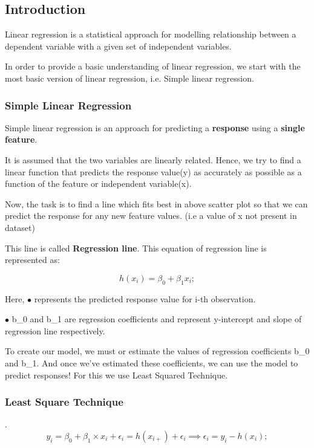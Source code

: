 \subsection{Introduction}

Linear regression is a statistical approach for modelling relationship between a dependent variable with a given set of independent variables.

In order to provide a basic understanding of linear regression, we start with the most basic version of linear regression, i.e. Simple linear regression.

\subsubsection{Simple Linear Regression}
Simple linear regression is an approach for predicting a \textbf{response} using a \textbf{single feature}.

It is assumed that the two variables are linearly related. Hence, we try to find a linear function that predicts the response value(y) as accurately as possible as a function of the feature or independent variable(x).

Now, the task is to find a line which fits best in above scatter plot so that we can predict the response for any new feature values. (i.e a value of x not present in dataset)

This line is called \textbf{Regression line}. This equation of regression line is represented as:

\begin{equation}
h(x_{i}) = \beta_{0} + \beta_{1}x_{i};
\end{equation}

Here, $\bullet$ represents the predicted response value for i-th observation.

$\bullet$ b\_0 and b\_1 are regression coefficients and represent y-intercept and slope of regression line respectively.

To create our model, we must  or estimate the values of regression coefficients b\_0 and b\_1. And once we've estimated these coefficients, we can use the model to predict responses!
For this we use Least Squared Technique.

\subsubsection{Least Square Technique}.
\begin{equation}
y_{i}=\beta_{0} + \beta_{1} \times x_{i} + \epsilon_{i} = h(x_{i+}) + \epsilon_{i}
\implies \epsilon_{i} = y_{i} - h(x_{i});
\end{equation}

